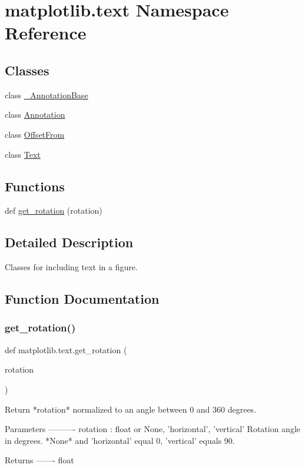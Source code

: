 \hypertarget{namespacematplotlib_1_1text}{}\section{matplotlib.\+text Namespace Reference}
\label{namespacematplotlib_1_1text}
\subsection*{Classes}
\begin{DoxyCompactItemize}
\item 
class \hyperlink{classmatplotlib_1_1text_1_1__AnnotationBase}{\+\_\+\+Annotation\+Base}
\item 
class \hyperlink{classmatplotlib_1_1text_1_1Annotation}{Annotation}
\item 
class \hyperlink{classmatplotlib_1_1text_1_1OffsetFrom}{Offset\+From}
\item 
class \hyperlink{classmatplotlib_1_1text_1_1Text}{Text}
\end{DoxyCompactItemize}
\subsection*{Functions}
\begin{DoxyCompactItemize}
\item 
def \hyperlink{namespacematplotlib_1_1text_a7cc84c97a14501d0920cce5f5bf27aff}{get\+\_\+rotation} (rotation)
\end{DoxyCompactItemize}


\subsection{Detailed Description}
\begin{DoxyVerb}Classes for including text in a figure.
\end{DoxyVerb}
 

\subsection{Function Documentation}
\mbox{\label{namespacematplotlib_1_1text_a7cc84c97a14501d0920cce5f5bf27aff}} 
\subsubsection{\texorpdfstring{get\+\_\+rotation()}{get\_rotation()}}
{\footnotesize\ttfamily def matplotlib.\+text.\+get\+\_\+rotation (\begin{DoxyParamCaption}\item[{}]{rotation }\end{DoxyParamCaption})}

\begin{DoxyVerb}Return *rotation* normalized to an angle between 0 and 360 degrees.

Parameters
----------
rotation : float or {None, 'horizontal', 'vertical'}
    Rotation angle in degrees. *None* and 'horizontal' equal 0,
    'vertical' equals 90.

Returns
-------
float
\end{DoxyVerb}
 